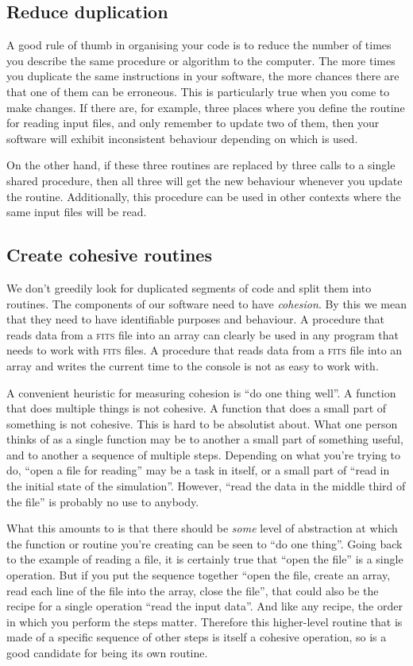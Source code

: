 \documentclass[a4paper]{article}
\begin{document}
\subsection{Reduce duplication}

A good rule of thumb in organising your code is to reduce the number of times you describe the same procedure or algorithm to the computer.
The more times you duplicate the same instructions in your software, the more chances there are that one of them can be erroneous.
This is particularly true when you come to make changes.
If there are, for example, three places where you define the routine for reading input files, and only remember to update two of them, then your software will exhibit inconsistent behaviour depending on which is used.

On the other hand, if these three routines are replaced by three calls to a single shared procedure, then all three will get the new behaviour whenever you update the routine.
Additionally, this procedure can be used in other contexts where the same input files will be read.

\subsection {Create cohesive routines}

We don't greedily look for duplicated segments of code and split them into routines.
The components of our software need to have \textit{cohesion}.
By this we mean that they need to have identifiable purposes and behaviour.
A procedure that reads data from a \textsc{fits} file into an array can clearly be used in any program that needs to work with \textsc{fits} files.
A procedure that reads data from a \textsc{fits} file into an array and writes the current time to the console is not as easy to work with.

A convenient heuristic for measuring cohesion is ``do one thing well''.
A function that does multiple things is not cohesive.
A function that does a small part of something is not cohesive.
This is hard to be absolutist about.
What one person thinks of as a single function may be to another a small part of something useful, and to another a sequence of multiple steps.
Depending on what you're trying to do, ``open a file for reading'' may be a task in itself, or a small part of ``read in the initial state of the simulation''.
However, ``read the data in the middle third of the file'' is probably no use to anybody.

What this amounts to is that there should be \textit{some} level of abstraction at which the function or routine you're creating can be seen to ``do one thing''.
Going back to the example of reading a file, it is certainly true that ``open the file'' is a single operation.
But if you put the sequence together ``open the file, create an array, read each line of the file into the array, close the file'', that could also be the recipe for a single operation ``read the input data''.
And like any recipe, the order in which you perform the steps matter.
Therefore this higher-level routine that is made of a specific sequence of other steps is itself a cohesive operation, so is a good candidate for being its own routine.
\end{document}
